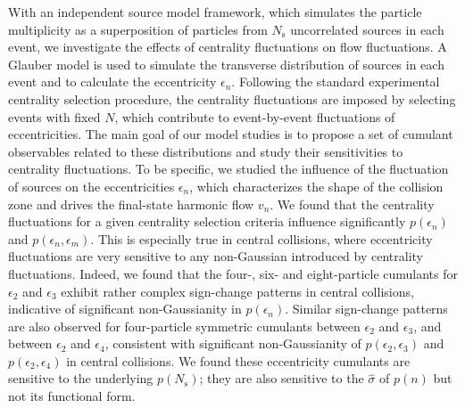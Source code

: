With an independent source model framework, which simulates the particle multiplicity as a superposition of particles from $N_\text{s}$ uncorrelated sources in each event, we investigate the effects of centrality fluctuations on flow fluctuations. A Glauber model is used to simulate the transverse distribution of sources in each event and to calculate the eccentricity $\epsilon_n$. Following the standard experimental centrality selection procedure, the centrality fluctuations are imposed by selecting events with fixed $N$, which contribute to event-by-event fluctuations of eccentricities. The main goal of our model studies is to propose a set of cumulant observables related to these distributions and study their sensitivities to centrality fluctuations. To be specific, we studied the influence of the fluctuation of sources on the eccentricities $\epsilon_n$, which characterizes the shape of the collision zone and drives the final-state harmonic flow $v_n$. We found that the centrality fluctuations for a given centrality selection criteria influence significantly $p(\epsilon_n)$ and $p(\epsilon_n, \epsilon_m)$. This is especially true in central collisions, where eccentricity fluctuations are very sensitive to any non-Gaussian introduced by centrality fluctuations. Indeed, we found that the four-, six- and eight-particle cumulants for $\epsilon_2$ and $\epsilon_3$ exhibit rather complex sign-change patterns in central collisions, indicative of significant non-Gaussianity in $p(\epsilon_n)$. Similar sign-change patterns are also observed for four-particle symmetric cumulants between $\epsilon_2$ and $\epsilon_3$, and between $\epsilon_2$ and $\epsilon_4$, consistent with significant non-Gaussianity of $p(\epsilon_2, \epsilon_3)$ and $p(\epsilon_2, \epsilon_4)$ in central collisions. We found these eccentricity cumulants are sensitive to the underlying $p(N_\text{s})$; they are also sensitive to the $\hat{\sigma}$ of $p(n)$ but not its functional form.

